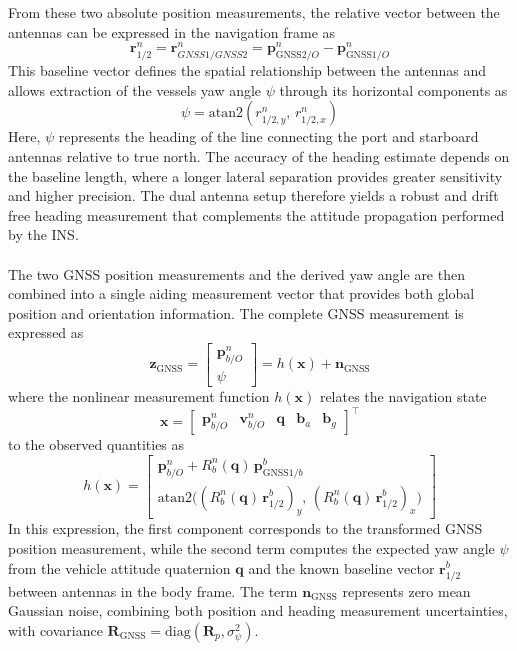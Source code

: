 \\ \\
From these two absolute position measurements, the relative vector between the antennas can be expressed in the navigation frame as
$$
    \mathbf{r}_{1/2}^{n} = \mathbf{r}_{GNSS1/GNSS2}^{n} = \mathbf{p}_{\text{GNSS2}/O}^{n} - \mathbf{p}_{\text{GNSS1}/O}^{n}
$$
This baseline vector defines the spatial relationship between the antennas and allows extraction of the vessels yaw angle $\psi$ through its horizontal components as
$$
    \psi = \text{atan2}(r_{1/2,y}^{n},\, r_{1/2,x}^{n})
$$
Here, $\psi$ represents the heading of the line connecting the port and starboard antennas relative to true north. The accuracy of the heading estimate depends on the baseline length, where a longer lateral separation provides greater sensitivity and higher precision. The dual antenna setup therefore yields a robust and drift free heading measurement that complements the attitude propagation performed by the INS.  
\\ \\
The two GNSS position measurements and the derived yaw angle are then combined into a single aiding measurement vector that provides both global position and orientation information. The complete GNSS measurement is expressed as
$$
    \mathbf{z}_{\text{GNSS}} =
    \begin{bmatrix}
        \mathbf{p}_{b/O}^{n} \\
        \psi
    \end{bmatrix}
    = h(\mathbf{x}) + \mathbf{n}_{\text{GNSS}}
$$
where the nonlinear measurement function $h(\mathbf{x})$ relates the navigation state
$$
    \mathbf{x} =
    \begin{bmatrix}
        \mathbf{p}_{b/O}^{n} & \mathbf{v}_{b/O}^{n} & \mathbf{q} & \mathbf{b}_a & \mathbf{b}_g
    \end{bmatrix}^\top
$$
to the observed quantities as
$$
    h(\mathbf{x}) =
    \begin{bmatrix}
        \mathbf{p}_{b/O}^{n} + R_b^n(\mathbf{q})\,\mathbf{p}_{\text{GNSS1}/b}^{b} \\
        \text{atan2}\big((R_b^n(\mathbf{q})\,\mathbf{r}_{1/2}^{b})_y,\,(R_b^n(\mathbf{q})\,\mathbf{r}_{1/2}^{b})_x\big)
    \end{bmatrix}
$$
In this expression, the first component corresponds to the transformed GNSS position measurement, while the second term computes the expected yaw angle $\psi$ from the vehicle attitude quaternion $\mathbf{q}$ and the known baseline vector $\mathbf{r}_{1/2}^{b}$ between antennas in the body frame. The term $\mathbf{n}_{\text{GNSS}}$ represents zero mean Gaussian noise, combining both position and heading measurement uncertainties, with covariance $\mathbf{R}_{\text{GNSS}} = \text{diag}(\mathbf{R}_{p}, \sigma_\psi^2)$.
